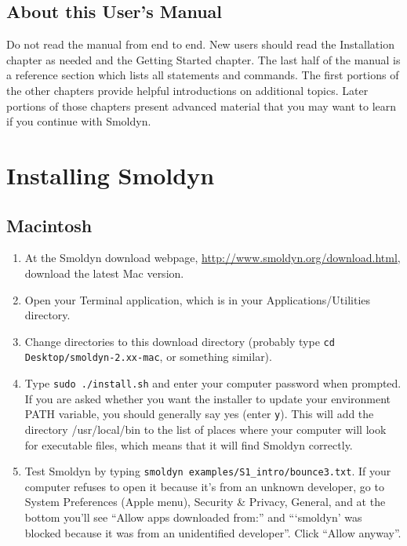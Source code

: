 \documentclass {scrbook}
\newcommand {\ttt} {\texttt}
\begin{document}
\subsection*{About this User's Manual}

Do not read the manual from end to end. New users should read the Installation chapter as needed and the Getting Started chapter. The last half of the manual is a reference section which lists all statements and commands. The first portions of the other chapters provide helpful introductions on additional topics. Later portions of those chapters present advanced material that you may want to learn if you continue with Smoldyn.

\section{Installing Smoldyn}
\subsection*{Macintosh}

\begin{enumerate}
\item At the Smoldyn download webpage, \url{http://www.smoldyn.org/download.html}, download the latest Mac version.
\item Open your Terminal application, which is in your Applications/Utilities directory.
\item Change directories to this download directory (probably type \ttt{cd Desktop/smoldyn-2.xx-mac}, or something similar).
\item Type \ttt{sudo ./install.sh} and enter your computer password when prompted. If you are asked whether you want the installer to update your environment PATH variable, you should generally say yes (enter \ttt{y}). This will add the directory /usr/local/bin to the list of places where your computer will look for executable files, which means that it will find Smoldyn correctly.
\item Test Smoldyn by typing \ttt{smoldyn examples/S1\_intro/bounce3.txt}. If your computer refuses to open it because it's from an unknown developer, go to System Preferences (Apple menu), Security \& Privacy, General, and at the bottom you'll see ``Allow apps downloaded from:'' and ```smoldyn' was blocked because it was from an unidentified developer''. Click ``Allow anyway''.
\end{enumerate}
\end{document}
